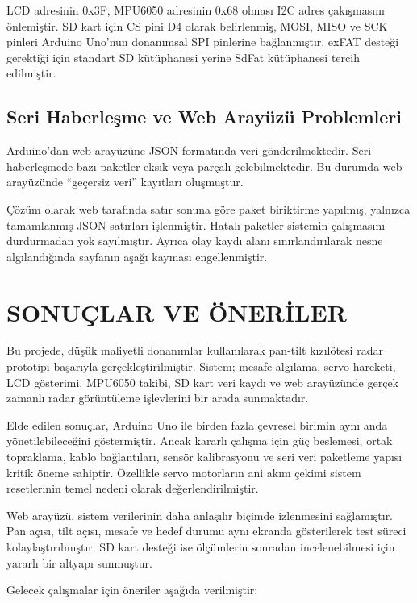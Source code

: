 LCD adresinin 0x3F, MPU6050 adresinin 0x68 olması I2C adres çakışmasını önlemiştir. SD kart için CS pini D4 olarak belirlenmiş, MOSI, MISO ve SCK pinleri Arduino Uno'nun donanımsal SPI pinlerine bağlanmıştır. exFAT desteği gerektiği için standart SD kütüphanesi yerine SdFat kütüphanesi tercih edilmiştir.

\subsection{Seri Haberleşme ve Web Arayüzü Problemleri}
Arduino'dan web arayüzüne JSON formatında veri gönderilmektedir. Seri haberleşmede bazı paketler eksik veya parçalı gelebilmektedir. Bu durumda web arayüzünde “geçersiz veri” kayıtları oluşmuştur.

Çözüm olarak web tarafında satır sonuna göre paket biriktirme yapılmış, yalnızca tamamlanmış JSON satırları işlenmiştir. Hatalı paketler sistemin çalışmasını durdurmadan yok sayılmıştır. Ayrıca olay kaydı alanı sınırlandırılarak nesne algılandığında sayfanın aşağı kayması engellenmiştir.

\section{SONUÇLAR VE ÖNERİLER}

Bu projede, düşük maliyetli donanımlar kullanılarak pan-tilt kızılötesi radar prototipi başarıyla gerçekleştirilmiştir. Sistem; mesafe algılama, servo hareketi, LCD gösterimi, MPU6050 takibi, SD kart veri kaydı ve web arayüzünde gerçek zamanlı radar görüntüleme işlevlerini bir arada sunmaktadır.

Elde edilen sonuçlar, Arduino Uno ile birden fazla çevresel birimin aynı anda yönetilebileceğini göstermiştir. Ancak kararlı çalışma için güç beslemesi, ortak topraklama, kablo bağlantıları, sensör kalibrasyonu ve seri veri paketleme yapısı kritik öneme sahiptir. Özellikle servo motorların ani akım çekimi sistem resetlerinin temel nedeni olarak değerlendirilmiştir.

Web arayüzü, sistem verilerinin daha anlaşılır biçimde izlenmesini sağlamıştır. Pan açısı, tilt açısı, mesafe ve hedef durumu aynı ekranda gösterilerek test süreci kolaylaştırılmıştır. SD kart desteği ise ölçümlerin sonradan incelenebilmesi için yararlı bir altyapı sunmuştur.

Gelecek çalışmalar için öneriler aşağıda verilmiştir:

